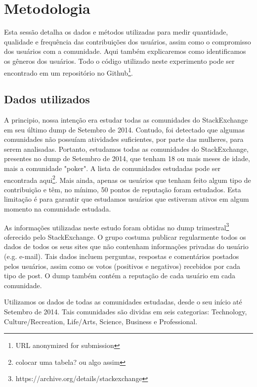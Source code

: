 \chapter{Metodologia}

Esta sessão detalha os dados e métodos utilizadas para medir quantidade, qualidade e frequência das contribuições dos usuários, assim como o compromisso dos usuários com a comunidade. Aqui também explicaremos como identificamos os gêneros dos usuários. Todo o código utilizado neste experimento pode ser encontrado em um repositório no Github\footnote{URL anonymized for submission}. 

\section{Dados utilizados}

A principio, nossa intenção era estudar todas as comunidades do StackExchange em seu último dump de Setembro de 2014. Contudo, foi detectado que algumas comunidades não possuíam atividades suficientes, por parte das mulheres, para serem analisadas. Portanto, estudamos todas as comunidades do StackExchange, presentes no dump de Setembro de 2014, que tenham 18 ou mais meses de idade, mais a comunidade "poker". A lista de comunidades estudadas pode ser encontrada aqui\footnote{colocar uma tabela? ou algo assim}. Mais ainda, apenas os usuários que tenham feito algum tipo de contribuição e têm, no mínimo, 50 pontos de reputação foram estudados. Esta limitação é para garantir que estudamos usuários que estiveram ativos em algum momento na comunidade estudada.

As informações utilizadas neste estudo foram obtidas no dump trimestral\footnote{https://archive.org/details/stackexchange} oferecido pelo StackExchange. O grupo costuma publicar regularmente todos os dados de todos os seus sites que não contenham informações privadas do usuário (e.g. e-mail). Tais dados incluem perguntas, respostas e comentários postados pelos usuários, assim como os votos (positivos e negativos) recebidos por cada tipo de post. O dump também contém a reputação de cada usuário em cada comunidade. 

Utilizamos os dados de todas as comunidades estudadas, desde o seu início até Setembro de 2014. Tais comunidades são dividas em seis categorias: Technology, Culture/Recreation, Life/Arts, Science, Business e Professional.

